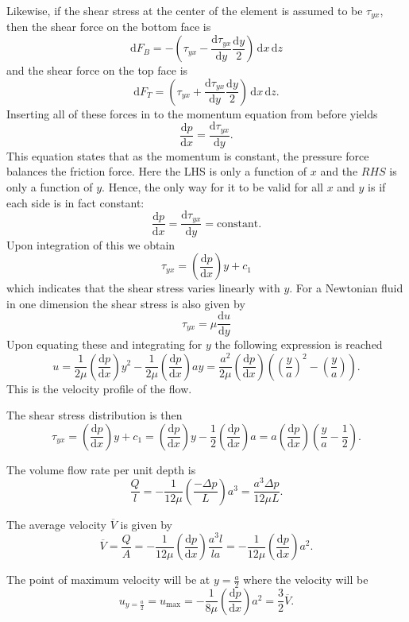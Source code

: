 Likewise, if the shear stress at the center of the element is assumed to be $\tau_{yx}$, then the shear force on the bottom face is
\[ 
\mathrm{d}F_B = - \left( \tau_{yx} - \frac{\mathrm{d}\tau_{yx}}{\mathrm{d}y} \frac{\mathrm{d}y}{2} \right) \, \mathrm{d}x \, \mathrm{d}z
\]
and the shear force on the top face is
\[ 
\mathrm{d}F_T = \left( \tau_{yx} + \frac{\mathrm{d}\tau_{yx}}{\mathrm{d}y} \frac{\mathrm{d}y}{2} \right) \, \mathrm{d}x \, \mathrm{d}z
.\]
Inserting all of these forces in to the momentum equation from before yields
\[ 
\frac{\mathrm{d}p}{\mathrm{d}x} = \frac{\mathrm{d}\tau_{yx}}{\mathrm{d}y} 
.\]
This equation states that as the momentum is constant, the pressure force balances the friction force.
Here the LHS is only a function of $x$ and the $RHS$ is only a function of $y$.
Hence, the only way for it to be valid for all $x$ and $y$ is if each side is in fact constant:
\[ 
\frac{\mathrm{d}p}{\mathrm{d}x} =\frac{\mathrm{d}\tau_{yx}}{\mathrm{d}y} = \mathrm{constant}
.\]
Upon integration of this we obtain
\[ 
\tau_{yx} = \left( \frac{\mathrm{d}p}{\mathrm{d}x}  \right)y + c_1
\]
which indicates that the shear stress varies linearly with $y$. 
For a Newtonian fluid in one dimension the shear stress is also given by
\[ 
\tau_{yx} = \mu \frac{\mathrm{d}u}{\mathrm{d}y} 
\]
Upon equating these and integrating for $y$ the following expression is reached
\[ 
u = \frac{1}{2\mu} \left( \frac{\mathrm{d}p}{\mathrm{d}x}  \right)y^2 - \frac{1}{2\mu} \left( \frac{\mathrm{d}p}{\mathrm{d}x}  \right)ay = \frac{a^2}{2\mu} \left( \frac{\mathrm{d}p}{\mathrm{d}x}  \right) \left( \left( \frac{y}{a} \right)^2 - \left( \frac{y}{a} \right) \right)
.\]
This is the velocity profile of the flow.

The shear stress distribution is then
\[ 
\tau_{yx} = \left( \frac{\mathrm{d}p}{\mathrm{d}x}  \right)y + c_1 = \left( \frac{\mathrm{d}p}{\mathrm{d}x}  \right)y - \frac{1}{2} \left( \frac{\mathrm{d}p}{\mathrm{d}x}  \right)a = a \left( \frac{\mathrm{d}p}{\mathrm{d}x}  \right) \left( \frac{y}{a} - \frac{1}{2} \right)
.\]

The volume flow rate per unit depth is
\[ 
\frac{Q}{l} = - \frac{1}{12\mu} \left( \frac{- \Delta p}{L} \right)a^3 = \frac{a^3 \Delta p}{12 \mu L}
.\]

The average velocity $\overline{V}$ is given by
\[ 
\overline{V} = \frac{Q}{A} = - \frac{1}{12\mu} \left( \frac{\mathrm{d}p}{\mathrm{d}x}  \right) \frac{a^3 l }{la} = - \frac{1}{12\mu} \left( \frac{\mathrm{d}p}{\mathrm{d}x}  \right)a^2
.\]

The point of maximum velocity will be at $y = \frac{a}{2}$ where the velocity will be
\[ 
u_{y = \frac{a}{2}} = u_{\mathrm{max}} = - \frac{1}{8\mu} \left( \frac{\mathrm{d}p}{\mathrm{d}x}  \right)a^2 = \frac{3}{2} \overline{V}
.\]


